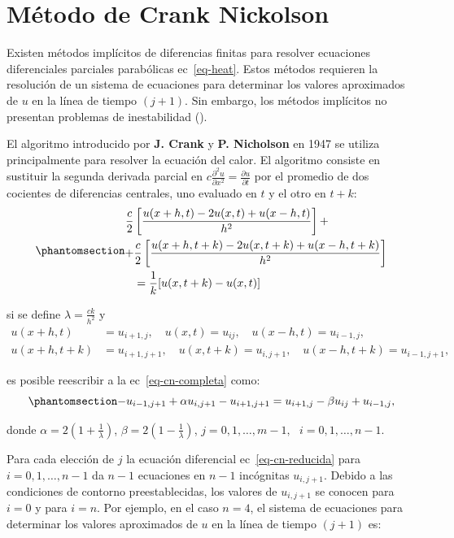 \documentclass[
  spanish,
  us-letterpaper,
]{scrreprt}
\theoremstyle{plain}
\theoremstyle{definition}
\theoremstyle{remark}
\begin{document}
\chapter{Método de Crank Nickolson}\label{muxe9todo-de-crank-nickolson}

Existen métodos implícitos de diferencias finitas para resolver
ecuaciones diferenciales parciales parabólicas ec~\ref{eq-heat}. Estos
métodos requieren la resolución de un sistema de ecuaciones para
determinar los valores aproximados de \(u\) en la línea de tiempo
\((j + 1)\). Sin embargo, los métodos implícitos no presentan problemas
de inestabilidad ().

El algoritmo introducido por \textbf{J. Crank} y \textbf{P. Nicholson}
en 1947 se utiliza principalmente para resolver la ecuación del calor.
El algoritmo consiste en sustituir la segunda derivada parcial en
\(c\frac{\partial^2 u}{\partial x^2} = \frac{\partial u}{\partial t}\)
por el promedio de dos cocientes de diferencias centrales, uno evaluado
en \(t\) y el otro en \(t+k\):
\begin{equation}\phantomsection\label{eq-cn-completa}{
\begin{split}
\dfrac{c}{2}& \left[\dfrac{u(x+h,t)-2u(x,t)+u(x-h,t)}{h^2}\right] + \\
    + &\dfrac{c}{2} \left[\dfrac{u(x+h,t+k)-2u(x,t+k)+u(x-h,t+k)}{h^2} \right] \\
            &= \dfrac{1}{k}[u(x,t+k)-u(x,t)]
\end{split}
}\end{equation}

si se define \(\lambda = \frac{ck}{h^2}\) y \[
\begin{split}
u(x+h,t) &=u_{i+1,j}, \quad u(x,t)=u_{ij}, \quad u(x-h,t)=u_{i-1,j}, \\
u(x+h,t+k) &=u_{i+1,j+1}, \quad u(x,t+k)=u_{i,j+1}, \quad u(x-h,t+k)=u_{i-1,j+1},
\end{split}
\]

es posible reescribir a la ec~\ref{eq-cn-completa} como:
\begin{equation}\phantomsection\label{eq-cn-reducida}{
-u_{i-1,j+1} + \alpha u_{i,j+1} - u_{i+1,j+1} = u_{i+1,j} - \beta u_{ij} + u_{i-1,j},
}\end{equation}

donde \(\alpha=2(1+\frac{1}{\lambda})\),
\(\beta=2(1-\frac{1}{\lambda})\),
\(j=0,1,\dots, m-1, \ \ \ i=0,1,\dots, n-1\).

Para cada elección de \(j\) la ecuación diferencial
ec~\ref{eq-cn-reducida} para \(i=0,1,\dots, n-1\) da \(n-1\) ecuaciones
en \(n-1\) incógnitas \(u_{i,j+1}\). Debido a las condiciones de
contorno preestablecidas, los valores de \(u_{i, j+1}\) se conocen para
\(i=0\) y para \(i=n\). Por ejemplo, en el caso \(n=4\), el sistema de
ecuaciones para determinar los valores aproximados de \(u\) en la línea
de tiempo \((j+1)\) es:
\end{document}
